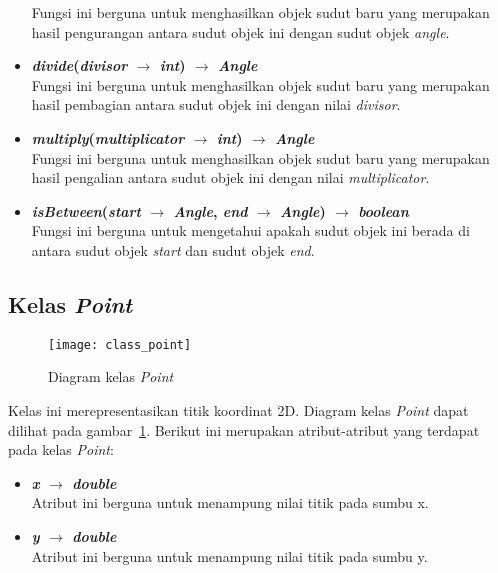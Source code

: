 \begin{itemize}
	Fungsi ini berguna untuk menghasilkan objek sudut baru yang merupakan hasil pengurangan antara sudut objek ini dengan sudut objek \textit{angle}.
	\item \textbf{\textit{divide}(\textit{divisor} \(\rightarrow\) \textit{int}) \(\rightarrow\) \textit{Angle}}\\
	Fungsi ini berguna untuk menghasilkan objek sudut baru yang merupakan hasil pembagian antara sudut objek ini dengan nilai \textit{divisor}.
	\item \textbf{\textit{multiply}(\textit{multiplicator} \(\rightarrow\) \textit{int}) \(\rightarrow\) \textit{Angle}}\\
	Fungsi ini berguna untuk menghasilkan objek sudut baru yang merupakan hasil pengalian antara sudut objek ini dengan nilai \textit{multiplicator}.
	\item \textbf{\textit{isBetween}(\textit{start} \(\rightarrow\) \textit{Angle}, \textit{end} \(\rightarrow\) \textit{Angle}) \(\rightarrow\) \textit{boolean}}\\
	Fungsi ini berguna untuk mengetahui apakah sudut objek ini berada di antara sudut objek \textit{start} dan sudut objek \textit{end}.
\end{itemize}

\subsection{Kelas \textit{Point}}
\begin{figure}[H]
	\centering  
	\texttt{[image: class\_point]}
	\caption[Diagram kelas \textit{Point}]{Diagram kelas \textit{Point}}
	\label{fig:class_point}
\end{figure}

Kelas ini merepresentasikan titik koordinat 2D. Diagram kelas \textit{Point} dapat dilihat pada gambar~\ref{fig:class_point}. Berikut ini merupakan atribut-atribut yang terdapat pada kelas \textit{Point}:
\begin{itemize}
	\item \textbf{\textit{x} \(\rightarrow\) \textit{double}}\\
	Atribut ini berguna untuk menampung nilai titik pada sumbu x.
	\item \textbf{\textit{y} \(\rightarrow\) \textit{double}}\\
	Atribut ini berguna untuk menampung nilai titik pada sumbu y.
\end{itemize}

